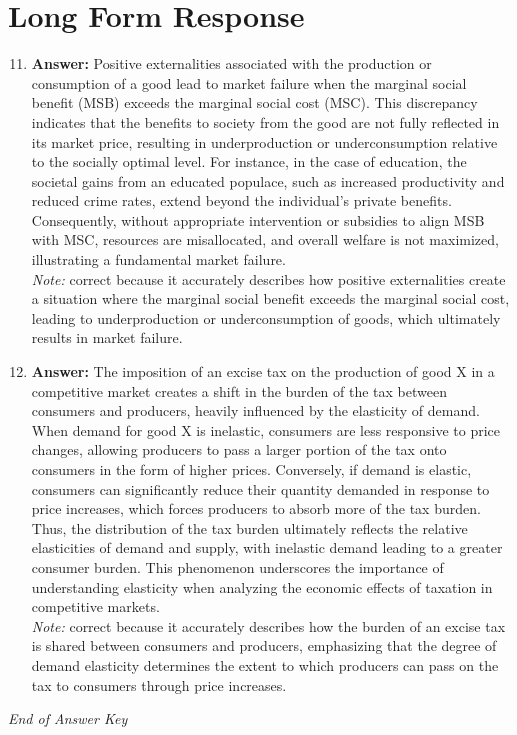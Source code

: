 \documentclass[12pt]{article}
\begin{document}
\section*{Long Form Response}
\begin{enumerate}[label=\arabic*.]
\setcounter{enumi}{10}
\item \textbf{Answer:} Positive externalities associated with the production or consumption of a good lead to market failure when the marginal social benefit (MSB) exceeds the marginal social cost (MSC). This discrepancy indicates that the benefits to society from the good are not fully reflected in its market price, resulting in underproduction or underconsumption relative to the socially optimal level. For instance, in the case of education, the societal gains from an educated populace, such as increased productivity and reduced crime rates, extend beyond the individual's private benefits. Consequently, without appropriate intervention or subsidies to align MSB with MSC, resources are misallocated, and overall welfare is not maximized, illustrating a fundamental market failure.
\\ \textit{Note:} correct because it accurately describes how positive externalities create a situation where the marginal social benefit exceeds the marginal social cost, leading to underproduction or underconsumption of goods, which ultimately results in market failure.
\item \textbf{Answer:} The imposition of an excise tax on the production of good X in a competitive market creates a shift in the burden of the tax between consumers and producers, heavily influenced by the elasticity of demand. When demand for good X is inelastic, consumers are less responsive to price changes, allowing producers to pass a larger portion of the tax onto consumers in the form of higher prices. Conversely, if demand is elastic, consumers can significantly reduce their quantity demanded in response to price increases, which forces producers to absorb more of the tax burden. Thus, the distribution of the tax burden ultimately reflects the relative elasticities of demand and supply, with inelastic demand leading to a greater consumer burden. This phenomenon underscores the importance of understanding elasticity when analyzing the economic effects of taxation in competitive markets.
\\ \textit{Note:} correct because it accurately describes how the burden of an excise tax is shared between consumers and producers, emphasizing that the degree of demand elasticity determines the extent to which producers can pass on the tax to consumers through price increases.
\end{enumerate}

\vfill
\noindent\textit{End of Answer Key}
\end{document}
